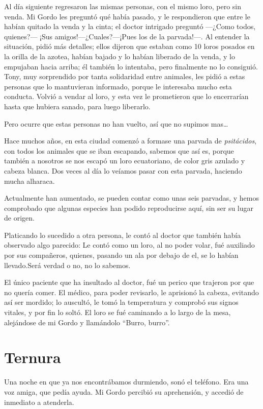 \documentclass[letterpaper, 12pt]{book}
\begin{document}
Al día siguiente regresaron las mismas personas, con el mismo loro, pero sin venda. Mi Gordo les preguntó qué había pasado, y le respondieron que entre le habían quitado la venda y la cinta; el doctor intrigado preguntó ---¿Como todos, quienes?---
¡Sus amigos!---¿Cuales?---¡Pues los de la parvada!---. Al entender la situación, pidió más detalles; ellos dijeron que estaban como 10 loros posados en la orilla de la azotea, habían bajado y lo habían liberado de la venda, y lo empujaban hacia arriba; él también lo intentaba, pero finalmente no lo consiguió. Tony, muy sorprendido por tanta solidaridad entre animales, les pidió a estas personas que lo mantuvieran informado, porque le interesaba mucho esta conducta. Volvió a vendar al loro, y esta vez le prometieron que lo encerrarían hasta que hubiera sanado, para luego liberarlo.

Pero ocurre que estas personas no han vuelto, así que no supimos mas\ldots

Hace muchos años, en esta ciudad comenzó a formase una parvada de \textit{psitácidos}, con todos los animales que se iban escapando, sabemos que así es, porque también a nosotros se nos escapó un loro ecuatoriano, de color gris azulado y cabeza blanca. Dos veces al día lo veíamos pasar con esta parvada, haciendo mucha alharaca. 

Actualmente han aumentado, se pueden contar como unas seis parvadas, y hemos comprobado que algunas especies han podido reproducirse aquí, sin ser su lugar de origen.

Platicando lo sucedido a otra persona, le contó al doctor que también había observado algo parecido: Le contó como un loro, al no poder volar, fué auxiliado por sus compañeros, quienes, pasando un ala por debajo de el, se lo habían llevado.Será verdad o no, no lo sabemos.

El único paciente que ha insultado al doctor, fué un perico que trajeron por que no quería comer. El médico, para poder revisarlo, le aprisionó la cabeza, evitando así ser mordido; lo auscultó, le tomó la temperatura y comprobó sus signos vitales, y por fin lo soltó. El loro se fué caminando a lo largo de la mesa, alejándose de mi Gordo y llamándolo ``Burro, burro''.


\chapter{Ternura}
Una noche en que ya nos encontrábamos durmiendo, sonó el teléfono. Era una voz amiga, que pedía ayuda. Mi Gordo percibió su aprehensión, y accedió de inmediato a atenderla. 
\end{document}
